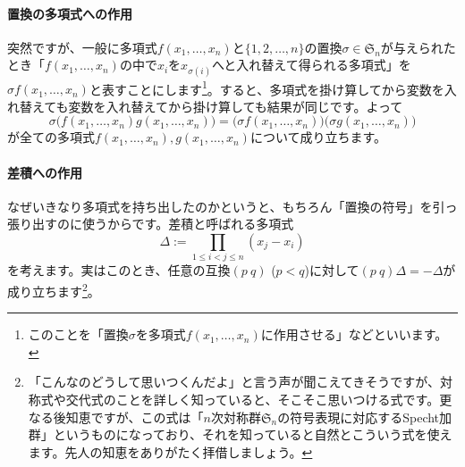\paragraph{置換の多項式への作用}
突然ですが、一般に多項式$f(x_1, \ldots, x_n)$と$\{1, 2, \ldots, n\}$の置換$\sigma \in \mathfrak{S}_n$が与えられたとき「$f(x_1, \ldots, x_n)$の中で$x_i$を$x_{\sigma(i)}$へと入れ替えて得られる多項式」を$\sigma f(x_1 ,\ldots, x_n)$と表すことにします\footnote{このことを「置換$\sigma$を多項式$f(x_1, \ldots, x_n)$に作用させる」などといいます。}。すると、多項式を掛け算してから変数を入れ替えても変数を入れ替えてから掛け算しても結果が同じです。よって
\[
\sigma\bigl(f(x_1, \ldots, x_n) g(x_1, \ldots, x_n)\bigr)
=\bigl(\sigma f(x_1, \ldots, x_n)\bigr) \bigl(\sigma g(x_1, \ldots, x_n)\bigr)
\]
が全ての多項式$f(x_1, \ldots, x_n), g(x_1, \ldots, x_n)$について成り立ちます。

\paragraph{差積への作用}

なぜいきなり多項式を持ち出したのかというと、もちろん「置換の符号」を引っ張り出すのに使うからです。差積と呼ばれる多項式
\[
\Delta := \prod_{1 \leq i  < j \leq n} (x_j - x_i)
\]
を考えます。実はこのとき、任意の互換$(p\ q)$ ($p < q$)に対して$(p\ q)\Delta = -\Delta$が成り立ちます\footnote{「こんなのどうして思いつくんだよ」と言う声が聞こえてきそうですが、対称式や交代式のことを詳しく知っていると、そこそこ思いつける式です。更なる後知恵ですが、この式は「$n$次対称群$\mathfrak{S}_n$の符号表現に対応するSpecht加群」というものになっており、それを知っていると自然とこういう式を使えます。先人の知恵をありがたく拝借しましょう。}。

